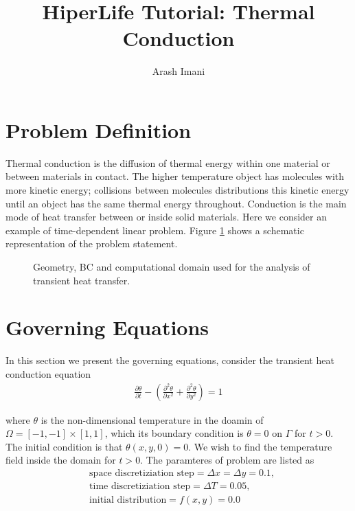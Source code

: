 \documentclass[]{article}
\begin{document}
\title{HiperLife Tutorial: Thermal Conduction}
\author{Arash Imani}
\maketitle

\linenumbers

\section{Problem Definition} \label{sec: pd}
Thermal conduction is the diffusion of thermal energy within one material or between materials in contact. The higher temperature object has molecules with more kinetic energy; collisions between molecules distributions this kinetic energy until an object has the same thermal energy throughout. Conduction is the main mode of heat transfer between or inside solid materials. Here we consider an  example of time-dependent linear problem. Figure \ref{fig_SB} shows a schematic representation of the problem statement.
\begin{figure}[htbp]
	\centering
	
	\caption{Geometry, BC and computational domain used for the analysis of transient heat transfer.}
	\label{fig_SB}
\end{figure}
\section{Governing Equations} \label{sec: ge}
In this section we present the governing equations, consider the transient heat conduction equation \cite{reddy2014introduction}
\begin{equation}\label{eq1}
	\begin{aligned}
		\frac{\partial \theta}{\partial t} - (\frac{\partial^2 \theta}{\partial x^2}+\frac{\partial^2 \theta}{\partial y^2}) = 1
	\end{aligned}
\end{equation}

where $\theta$ is the non-dimensional temperature in the doamin of $\Omega=[-1,-1]\times[1,1]$, which its
boundary condition is $\theta = 0$ on $\Gamma$ for $t > 0$. The initial
condition is that $\theta(x, y, 0) = 0$. We wish to find the temperature field inside the domain for
$t > 0$.
The paramteres of problem are listed as
\begin{equation}\label{eq2}
	\begin{aligned}
		&\text{space discretiziation step}= \Delta x = \Delta y = 0.1, \\
		&\text{time discretiziation step}= \Delta T = 0.05, \\
		&\text{initial distribution}= f(x,y) = 0.0\\
	\end{aligned}
\end{equation}
\end{document}
